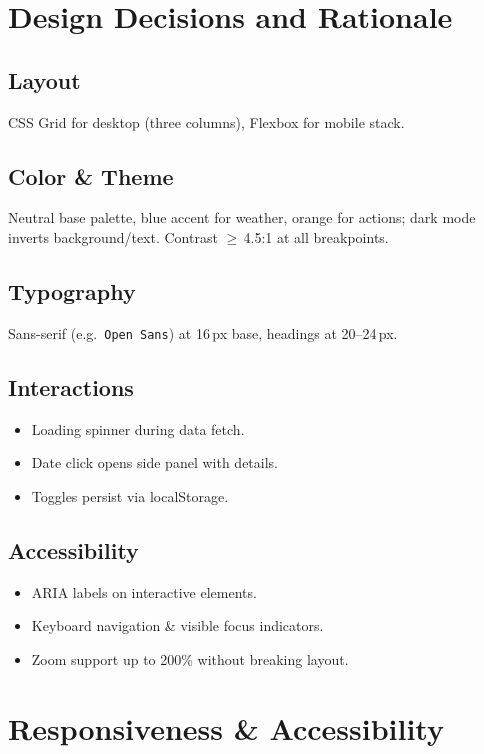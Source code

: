 \documentclass[11pt,a4paper]{article}
\begin{document}
\section{Design Decisions and Rationale}

\subsection{Layout}
CSS Grid for desktop (three columns), Flexbox for mobile stack.

\subsection{Color \& Theme}
Neutral base palette, blue accent for weather, orange for actions; dark mode inverts background/text. Contrast $\geq$\,4.5:1 at all breakpoints.

\subsection{Typography}
Sans-serif (e.g.\ \texttt{Open Sans}) at 16\,px base, headings at 20--24\,px.

\subsection{Interactions}
\begin{itemize}[nosep]
  \item Loading spinner during data fetch.
  \item Date click opens side panel with details.
  \item Toggles persist via localStorage.
\end{itemize}

\subsection{Accessibility}
\begin{itemize}[nosep]
  \item ARIA labels on interactive elements.
  \item Keyboard navigation \& visible focus indicators.
  \item Zoom support up to 200\% without breaking layout.
\end{itemize}

\section{Responsiveness \& Accessibility}
\end{document}
